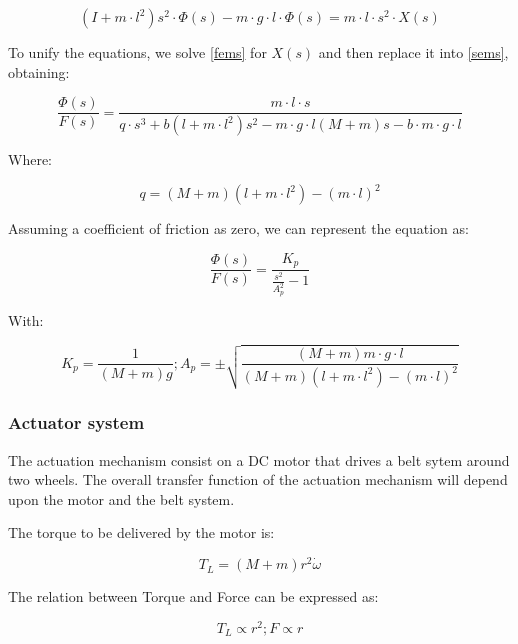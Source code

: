 \documentclass{article}
\begin{document}
\begin{equation} \label{sems}
	(I+m\cdot l^2)s^2\cdot \Phi(s)-m\cdot g\cdot l\cdot \Phi(s)=m\cdot l\cdot s^2\cdot X(s)
\end{equation}

To unify the equations, we solve \ref{fems} for $X(s)$ and then replace it into \ref{sems}, obtaining:

\begin{equation} \label{ecms}
	\frac{\Phi(s)}{F(s)}=\frac{m\cdot l\cdot s}{q\cdot s^3+b(l+m\cdot l^2)s^2-m\cdot g\cdot l(M+m)s-b\cdot m\cdot g\cdot l}
\end{equation}

Where:

\begin{equation} \label{dq}
	q=(M+m)(l+m\cdot l^2)-(m\cdot l)^2
\end{equation}

Assuming a coefficient of friction as zero, we can represent the equation as:

\begin{equation} \label{efms}
	\frac{\Phi(s)}{F(s)}=\frac{K_p}{\frac{s^2}{A_p^2}-1}
\end{equation}

With:

\begin{equation} \label{dka}
	K_p=\frac{1}{(M+m)g} ; A_p=\pm \sqrt{\frac{(M+m)m\cdot g\cdot l}{(M+m)(l+m\cdot l^2)-(m\cdot l)^2}}
\end{equation}

\subsubsection{Actuator system}

The actuation mechanism consist on a DC motor that drives a belt sytem around two wheels. The overall transfer function of the actuation mechanism will depend upon the motor and the belt system.

The torque to be delivered by the motor is:

\begin{equation} \label{t}
	T_L=(M+m)r^2\dot{\omega}
\end{equation}

The relation between Torque and Force can be expressed as:

\begin{equation} \label{dtf}
	T_L\propto r^2 ; F\propto r
\end{equation}
\end{document}
